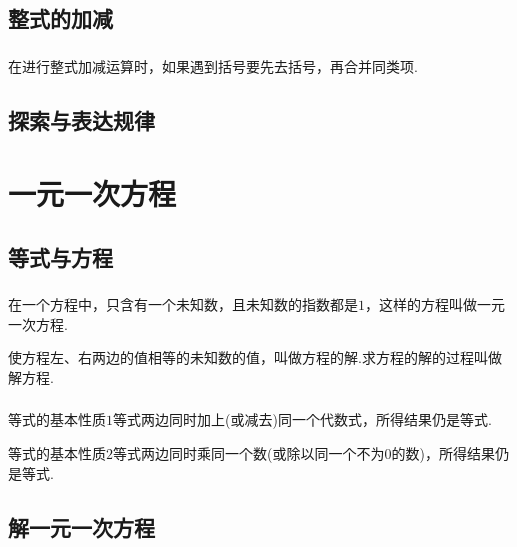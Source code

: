 \documentclass[fontset=windows]{ctexrep}
\begin{document}
\section{整式的加减}
\subsection{}
\par 在进行整式加减运算时，如果遇到括号要先去括号，再合并同类项.
\subsection{}
\section{探索与表达规律}
\subsection{}
\subsection{}
\chapter{一元一次方程}
\section{等式与方程}
\subsection{}
\par 在一个方程中，只含有一个未知数，且未知数的指数都是$1$，这样的方程叫做{\heiti 一元一次方程}.
\par 使方程左、右两边的值相等的未知数的值，叫做{\heiti 方程的解}.求方程的解的过程叫做{\heiti 解方程}.
\subsection{}
\par {\heiti 等式的基本性质$1$}\quad 等式两边同时加上(或减去)同一个代数式，所得结果仍是等式.
\par {\heiti 等式的基本性质$2$}\quad 等式两边同时乘同一个数(或除以同一个不为$0$的数)，所得结果仍是等式.
\section{解一元一次方程}
\end{document}
